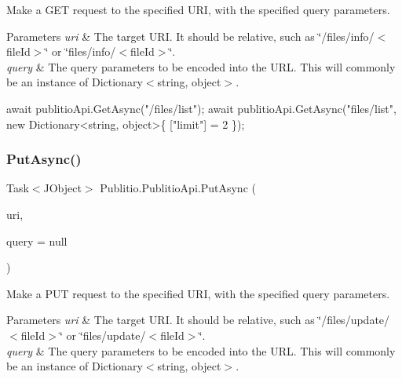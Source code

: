 Make a G\+ET request to the specified U\+RI, with the specified query parameters.


\begin{DoxyParams}{Parameters}
{\em uri} & The target U\+RI. It should be relative, such as \char`\"{}/files/info/$<$file\+Id$>$\char`\"{} or \char`\"{}files/info/$<$file\+Id$>$\char`\"{}.\\
\hline
{\em query} & The query parameters to be encoded into the U\+RL. This will commonly be an instance of {\ttfamily Dictionary$<$string, object$>$}.\\
\hline
\end{DoxyParams}



\begin{DoxyCode}
await publitioApi.GetAsync(\textcolor{stringliteral}{"/files/list"});
await publitioApi.GetAsync(\textcolor{stringliteral}{"files/list"}, \textcolor{keyword}{new} Dictionary<string, object>\{ [\textcolor{stringliteral}{"limit"}] = 2 \});
\end{DoxyCode}
 \mbox{\label{classPublitio_1_1PublitioApi_aa938b3d9b61bffa8bb341961252feba3}} 
\subsubsection{\texorpdfstring{Put\+Async()}{PutAsync()}}
{\footnotesize\ttfamily Task$<$J\+Object$>$ Publitio.\+Publitio\+Api.\+Put\+Async (\begin{DoxyParamCaption}\item[{string}]{uri,  }\item[{I\+Enumerable$<$ Key\+Value\+Pair$<$ string, object $>$$>$}]{query = {\ttfamily null} }\end{DoxyParamCaption})}



Make a P\+UT request to the specified U\+RI, with the specified query parameters.


\begin{DoxyParams}{Parameters}
{\em uri} & The target U\+RI. It should be relative, such as \char`\"{}/files/update/$<$file\+Id$>$\char`\"{} or \char`\"{}files/update/$<$file\+Id$>$\char`\"{}.\\
\hline
{\em query} & The query parameters to be encoded into the U\+RL. This will commonly be an instance of {\ttfamily Dictionary$<$string, object$>$}.\\
\hline
\end{DoxyParams}




